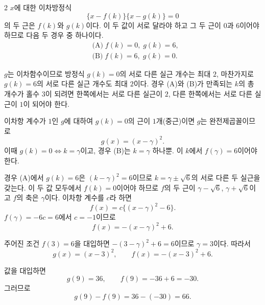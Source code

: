 \documentclass[10pt]{article}
\begin{document}
\begin{multicols}{2}
$x$에 대한 이차방정식
\[ \{x - f(k)\}\{x - g(k)\} = 0 \]
의 두 근은 $f(k)$와 $g(k)$이다. 이 두 값이 서로 달라야 하고 그 두 근이 $0$과 $6$이어야 하므로 다음 두 경우 중 하나이다.
\begin{align*}
&\text{(A)}\; f(k) = 0,\; g(k) = 6, \\
&\text{(B)}\; f(k) = 6,\; g(k) = 0.
\end{align*}

$g$는 이차함수이므로 방정식 $g(k) = 0$의 서로 다른 실근 개수는 최대 $2$, 마찬가지로 $g(k) = 6$의 서로 다른 실근 개수도 최대 $2$이다. 경우 (A)와 (B)가 만족되는 $k$의 총 개수가 홀수 $3$이 되려면 한쪽에서는 서로 다른 실근이 $2$, 다른 한쪽에서는 서로 다른 실근이 $1$이 되어야 한다.

이차항 계수가 $1$인 $g$에 대하여 $g(k) = 0$의 근이 $1$개(중근)이면 $g$는 완전제곱꼴이므로
\[ g(x) = (x - \gamma)^2. \]
이때 $g(k) = 0 \iff k = \gamma$이고, 경우 (B)는 $k = \gamma$ 하나뿐. 이 $k$에서 $f(\gamma) = 6$이어야 한다.

경우 (A)에서 $g(k) = 6$은 $(k - \gamma)^2 = 6$이므로 $k = \gamma \pm \sqrt{6}$의 서로 다른 두 실근을 갖는다. 이 두 값 모두에서 $f(k) = 0$이어야 하므로 $f$의 두 근이 $\gamma - \sqrt{6}$, $\gamma + \sqrt{6}$이고 $f$의 축은 $\gamma$이다. 이차항 계수를 $c$라 하면
\[ f(x) = c\{(x - \gamma)^2 - 6\}. \]
$f(\gamma) = -6c = 6$에서 $c = -1$이므로
\[ f(x) = -(x - \gamma)^2 + 6. \]

주어진 조건 $f(3) = 6$을 대입하면 $-(3 - \gamma)^2 + 6 = 6$이므로 $\gamma = 3$이다. 따라서
\[ g(x) = (x - 3)^2,\qquad f(x) = -(x - 3)^2 + 6. \]

값을 대입하면
\[ g(9) = 36,\qquad f(9) = -36 + 6 = -30. \]
그러므로
\[ g(9) - f(9) = 36 - (-30) = 66. \]

\end{multicols}
\end{document}
